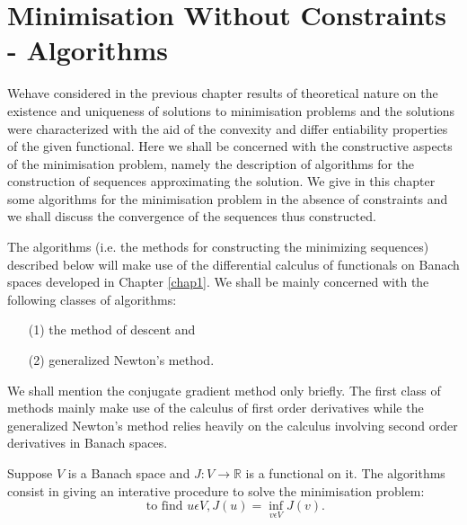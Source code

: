  

\chapter{Minimisation Without Constraints - Algorithms}\label{chap3}
We\pageoriginale have considered in the previous chapter results of theoretical nature on the existence and uniqueness of solutions to minimisation problems and the solutions were characterized with the aid of the convexity and differ entiability properties of the given functional. Here we shall be concerned with the constructive aspects of the minimisation problem, namely the description of algorithms for the construction of sequences approximating the solution. We give in this chapter some algorithms for the minimisation problem in the absence of constraints and we shall discuss the convergence of the sequences thus constructed.

The algorithms (i.e. the methods for constructing the minimizing sequences) described below will make use of the differential calculus of functionals on Banach spaces developed in Chapter \ref{chap1}. We shall be mainly concerned with the following classes of algorithms:
\begin{enumerate}
\item[(1)] the method of descent and

\item[(2)] generalized Newton's method.
\end{enumerate}

We shall mention the conjugate gradient method only briefly. The first class of methods mainly make use of the calculus of first order derivatives while the generalized Newton's method relies heavily on the calculus involving second order derivatives in Banach spaces.

Suppose $V$ is a Banach space and $J : V \to \mathbb{R}$ is a functional on it. The algorithms consist in giving an interative procedure to solve the minimisation problem:
$$
\text{ to find } u \epsilon V, J(u) = \inf_{v \epsilon V} J(v).
$$\pageoriginale

